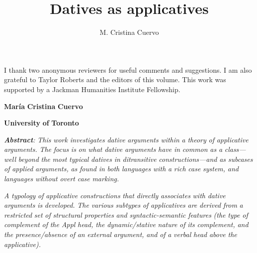 \documentclass[output=paper,modfonts,nonflat]{langsci/langscibook}
\author{M. Cristina Cuervo\affiliation{}}
\title{Datives as applicatives}
\begin{document}
\maketitle 
{I thank two anonymous reviewers for useful comments and suggestions. I am also grateful to Taylor Roberts and the editors of this volume. This work was supported by a Jackman Humanities Institute Fellowship.} 

\textbf{María} \textbf{Cristina} \textbf{Cuervo}

\textbf{University} \textbf{of} \textbf{Toronto}

\textbf{\textit{Abstract}}\textit{:} \textit{This} \textit{work} \textit{investigates} \textit{dative} \textit{arguments} \textit{within} \textit{a} \textit{theory} \textit{of} \textit{applicative} \textit{arguments.} \textit{The} \textit{focus} \textit{is} \textit{on} \textit{what} \textit{dative} \textit{arguments} \textit{have} \textit{in} \textit{common} \textit{as} \textit{a} \textit{class—well} \textit{beyond} \textit{the} \textit{most} \textit{typical} \textit{datives} \textit{in} \textit{ditransitive} \textit{constructions—and} \textit{as} \textit{subcases} \textit{of} \textit{applied} \textit{arguments,} \textit{as} \textit{found} \textit{in} \textit{both} \textit{languages} \textit{with} \textit{a} \textit{rich} \textit{case} \textit{system,} \textit{and} \textit{languages} \textit{without} \textit{overt} \textit{case} \textit{marking.}

\textit{A} \textit{typology} \textit{of} \textit{applicative} \textit{constructions} \textit{that} \textit{directly} \textit{associates} \textit{with} \textit{dative} \textit{arguments} \textit{is} \textit{developed.} \textit{The} \textit{various} \textit{subtypes} \textit{of} \textit{applicatives} \textit{are} \textit{derived} \textit{from} \textit{a} \textit{restricted} \textit{set} \textit{of} \textit{structural} \textit{properties} \textit{and} \textit{syntactic-semantic} \textit{features} \textit{(the} \textit{type} \textit{of} \textit{complement} \textit{of} \textit{the} \textit{Appl} \textit{head,} \textit{the} \textit{dynamic/stative} \textit{nature} \textit{of} \textit{its} \textit{complement,} \textit{and} \textit{the} \textit{presence/absence} \textit{of} \textit{an} \textit{external} \textit{argument,} \textit{and} \textit{of} \textit{a} \textit{verbal} \textit{head} \textit{above} \textit{the} \textit{applicative).}
\end{document}
